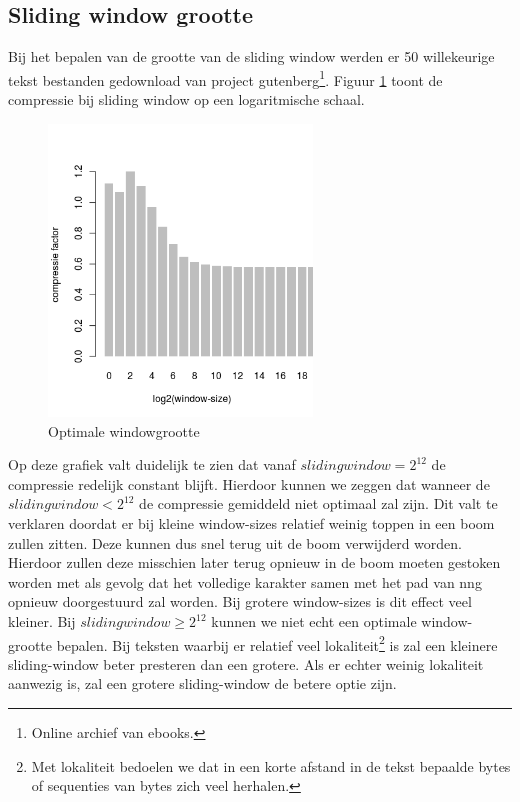 \documentclass[twoside,twocolumn]{article}
\begin{document}
    \subsection{Sliding window grootte}
        Bij het bepalen van de grootte van de sliding window werden er 50 willekeurige tekst bestanden gedownload van project gutenberg\footnote{Online archief van ebooks. }.
        Figuur \ref{venstergrootte} toont de compressie bij sliding window op een logaritmische schaal.
        \begin{figure}[H]
            \begin{center}
                \includegraphics[width=7cm]{images/venstergrootte.png}    
            \end{center}
            \caption{Optimale windowgrootte}
            \label{venstergrootte}
        \end{figure}
    Op deze grafiek valt duidelijk te zien dat vanaf $slidingwindow=2^{12}$ de compressie redelijk constant blijft. Hierdoor kunnen we zeggen dat wanneer de $slidingwindow<2^{12}$ de compressie gemiddeld niet optimaal zal zijn. Dit valt te verklaren doordat er bij kleine window-sizes relatief weinig toppen in een boom zullen zitten.  Deze kunnen dus snel terug uit de boom verwijderd worden. Hierdoor zullen deze misschien later terug opnieuw in de boom moeten gestoken worden met als gevolg dat het volledige karakter samen met het pad van nng opnieuw doorgestuurd zal worden. Bij grotere window-sizes is dit effect veel kleiner. Bij $slidingwindow\geq2^{12}$ kunnen we niet echt een optimale window-grootte bepalen. Bij teksten waarbij er relatief veel lokaliteit\footnote{Met lokaliteit bedoelen we dat in een korte afstand in de tekst bepaalde bytes of sequenties van bytes zich veel herhalen.} is zal een kleinere sliding-window beter presteren dan een grotere. Als er echter weinig lokaliteit aanwezig is, zal een grotere sliding-window de betere optie zijn.
\end{document}
